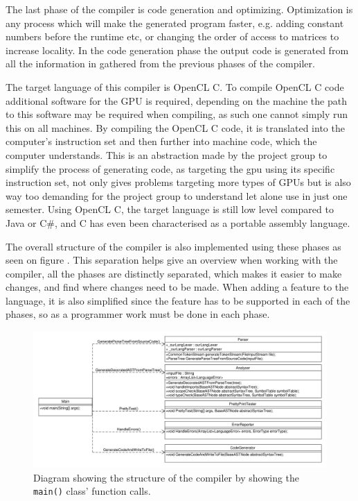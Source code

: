 The last phase of the compiler is code generation and optimizing.
Optimization is any process which will make the generated program faster, e.g. adding constant numbers before the runtime etc, or changing the order of access to matrices to increase locality. 
In the code generation phase the output code is generated from all the information in gathered from the previous phases of the compiler.

The target language of this compiler is OpenCL C.
To compile OpenCL C code additional software for the GPU is required, depending on the machine the path to this software may be required when compiling, as such one cannot simply run this on all machines.
By compiling the OpenCL C code, it is translated into the computer's instruction set and then further into machine code, which the computer understands.
This is an abstraction made by the project group to simplify the process of generating code, as targeting the \acrshort{gpu} using its specific instruction set, not only gives problems targeting more types of GPUs but is also way too demanding for the project group to understand let alone use in just one semester.
Using OpenCL C, the target language is still low level compared to Java or C\#, and C has even been characterised as a portable assembly language.\citep{CPort}

The overall structure of the compiler is also implemented using these phases as seen on figure .
This separation helps give an overview when working with the compiler, all the phases are distinctly separated, which makes it easier to make changes, and find where changes need to be made.
When adding a feature to the language, it is also simplified since the feature has to be supported in each of the phases, so as a programmer work must be done in each phase.
\begin{figure}
\centering
\includegraphics[width=1\textwidth]{figures/ClassDiagrams/DiagramOfCallsFromMain.pdf}
\caption{Diagram showing the structure of the compiler by showing the \texttt{main()} class' function calls.}\label{fig:compilerOverview}
\end{figure}


